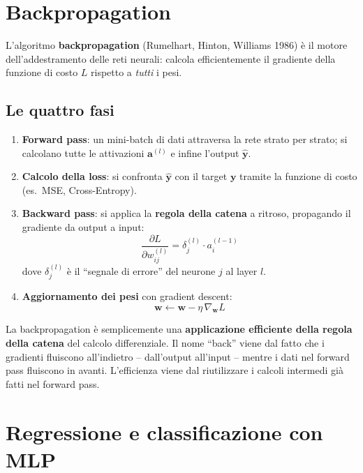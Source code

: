 \section{Backpropagation}

L'algoritmo \textbf{backpropagation} (Rumelhart, Hinton, Williams 1986) è il motore dell'addestramento delle reti neurali: calcola efficientemente il gradiente della funzione di costo $L$ rispetto a \emph{tutti} i pesi.

\subsection{Le quattro fasi}

\begin{enumerate}
    \item \textbf{Forward pass}: un mini-batch di dati attraversa la rete strato per strato; si calcolano tutte le attivazioni $\mathbf{a}^{(l)}$ e infine l'output $\hat{\mathbf{y}}$.
    \item \textbf{Calcolo della loss}: si confronta $\hat{\mathbf{y}}$ con il target $\mathbf{y}$ tramite la funzione di costo (es.\ MSE, Cross-Entropy).
    \item \textbf{Backward pass}: si applica la \textbf{regola della catena} a ritroso, propagando il gradiente da output a input:
    \[
    \frac{\partial L}{\partial w_{ij}^{(l)}} = \delta_j^{(l)} \cdot a_i^{(l-1)}
    \]
    dove $\delta_j^{(l)}$ è il ``segnale di errore'' del neurone $j$ al layer $l$.
    \item \textbf{Aggiornamento dei pesi} con gradient descent:
    \[
    \mathbf{w} \leftarrow \mathbf{w} - \eta \, \nabla_{\mathbf{w}} L
    \]
\end{enumerate}

\begin{notebox}
La backpropagation è semplicemente una \textbf{applicazione efficiente della regola della catena} del calcolo differenziale. Il nome ``back'' viene dal fatto che i gradienti fluiscono all'indietro -- dall'output all'input -- mentre i dati nel forward pass fluiscono in avanti. L'efficienza viene dal riutilizzare i calcoli intermedi già fatti nel forward pass.
\end{notebox}

\section{Regressione e classificazione con MLP}

